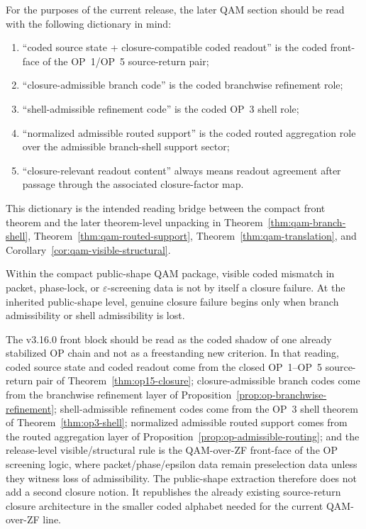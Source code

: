 \begin{remark}\label{rem:public-shape-reading-guide}
For the purposes of the current release, the later QAM section should be read with the following dictionary in mind:
\begin{enumerate}[leftmargin=2em]
  \item ``coded source state + closure-compatible coded readout'' is the coded front-face of the OP~1/OP~5 source-return pair;
  \item ``closure-admissible branch code'' is the coded branchwise refinement role;
  \item ``shell-admissible refinement code'' is the coded OP~3 shell role;
  \item ``normalized admissible routed support'' is the coded routed aggregation role over the admissible branch-shell support sector;
  \item ``closure-relevant readout content'' always means readout agreement after passage through the associated closure-factor map.
\end{enumerate}
This dictionary is the intended reading bridge between the compact front theorem and the later theorem-level unpacking in Theorem~\ref{thm:qam-branch-shell}, Theorem~\ref{thm:qam-routed-support}, Theorem~\ref{thm:qam-translation}, and Corollary~\ref{cor:qam-visible-structural}.
\end{remark}

\begin{corollary}\label{cor:release-visible-structural-rule}
Within the compact public-shape QAM package, visible coded mismatch in packet, phase-lock, or $\varepsilon$-screening data is not by itself a closure failure. At the inherited public-shape level, genuine closure failure begins only when branch admissibility or shell admissibility is lost.
\end{corollary}

\begin{remark}
The v3.16.0 front block should be read as the coded shadow of one already stabilized OP chain and not as a freestanding new criterion. In that reading, coded source state and coded readout come from the closed OP~1--OP~5 source-return pair of Theorem~\ref{thm:op15-closure}; closure-admissible branch codes come from the branchwise refinement layer of Proposition~\ref{prop:op-branchwise-refinement}; shell-admissible refinement codes come from the OP~3 shell theorem of Theorem~\ref{thm:op3-shell}; normalized admissible routed support comes from the routed aggregation layer of Proposition~\ref{prop:op-admissible-routing}; and the release-level visible/structural rule is the QAM-over-ZF front-face of the OP screening logic, where packet/phase/epsilon data remain preselection data unless they witness loss of admissibility. The public-shape extraction therefore does not add a second closure notion. It republishes the already existing source-return closure architecture in the smaller coded alphabet needed for the current QAM-over-ZF line.
\end{remark}

